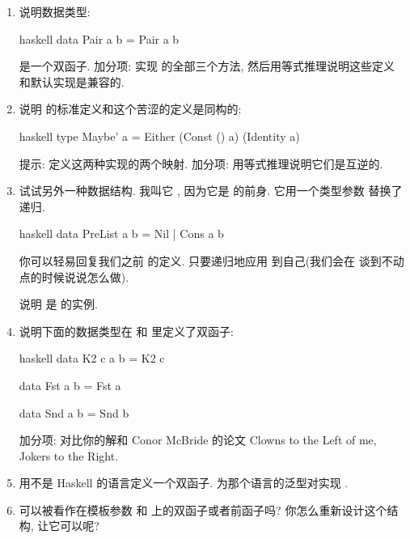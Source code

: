 \begin{enumerate}
  \tightlist
  \item
        说明数据类型:

        \begin{snip}{haskell}
data Pair a b = Pair a b
\end{snip}

        是一个双函子. 加分项: 实现  的全部三个方法, 然后用等式推理说明这些定义
        和默认实现是兼容的.
  \item
        说明  的标准定义和这个苦涩的定义是同构的:

        \begin{snip}{haskell}
type Maybe' a = Either (Const () a) (Identity a)
\end{snip}

        提示: 定义这两种实现的两个映射. 加分项: 用等式推理说明它们是互逆的.
  \item
        试试另外一种数据结构. 我叫它 , 因为它是  的前身. 它用一个类型参数
         替换了递归.

        \begin{snip}{haskell}
data PreList a b = Nil | Cons a b
\end{snip}

        你可以轻易回复我们之前  的定义. 只要递归地应用  到自己(我们会在
        谈到不动点的时候说说怎么做).

        说明  是  的实例.
  \item
        说明下面的数据类型在  和  里定义了双函子:

        \begin{snip}{haskell}
data K2 c a b = K2 c

data Fst a b = Fst a

data Snd a b = Snd b
\end{snip}

        加分项: 对比你的解和 Conor McBride 的论文 
        {Clowns to the Left of me, Jokers to the Right}.
  \item
        用不是 Haskell 的语言定义一个双函子. 为那个语言的泛型对实现 .
  \item
         可以被看作在模板参数  和  上的双函子或者前函子吗?
        你怎么重新设计这个结构, 让它可以呢?
\end{enumerate}
